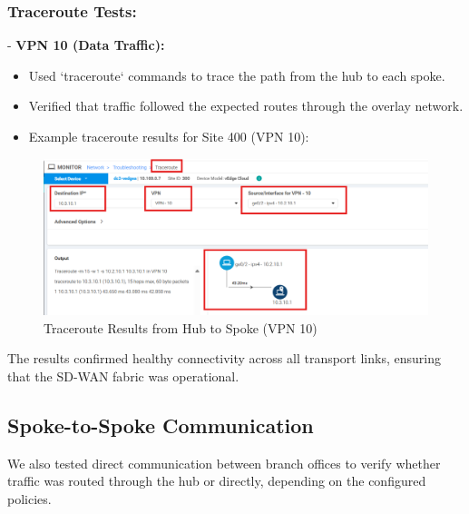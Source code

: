 \documentclass[12pt,english]{report}
\begin{document}
\subsubsection{Traceroute Tests:}
- \textbf{VPN 10 (Data Traffic):}
  \begin{itemize}
      \item Used `traceroute` commands to trace the path from the hub to each spoke.
      \item Verified that traffic followed the expected routes through the overlay network.
      \item Example traceroute results for Site 400 (VPN 10):
  \end{itemize}
    \begin{figure}[H]
        \centering
        \includegraphics[width=1\textwidth]{chapter 4/hub-spoke-traceroute-vpn10.png}
        \caption{Traceroute Results from Hub to Spoke (VPN 10)}
        \label{fig:traceroute_vpn10}
    \end{figure}

The results confirmed healthy connectivity across all transport links, ensuring that the SD-WAN fabric was operational.

\subsection{Spoke-to-Spoke Communication}
We also tested direct communication between branch offices to verify whether traffic was routed through the hub or directly, depending on the configured policies.
\end{document}
